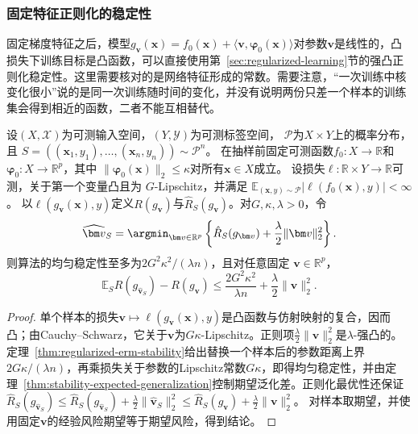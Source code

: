 \subsubsection{固定特征正则化的稳定性}

固定梯度特征之后，模型$g_{\bm v}(\bm x)=f_0(\bm x)+\langle\bm v,\bm\varphi_0(\bm x)\rangle$对参数$\bm v$是线性的，凸损失下训练目标是凸函数，可以直接使用第~\ref{sec:regularized-learning}节的强凸正则化稳定性。这里需要核对的是网络特征形成的常数。需要注意，“一次训练中核变化很小”说的是同一次训练随时间的变化，并没有说明两份只差一个样本的训练集会得到相近的函数，二者不能互相替代。

\begin{theorem}[正则化固定特征模型的稳定性]
\label{thm:ntk-stability-risk}
设$(X,\mathcal X)$为可测输入空间，$(Y,\mathcal Y)$为可测标签空间，
$\mathcal P$为$X\times Y$上的概率分布，且
$S=((\bm x_1,y_1),\ldots,(\bm x_n,y_n))\sim\mathcal P^n$。
在抽样前固定可测函数$f_0:X\to\mathbb R$和
$\bm\varphi_0:X\to\mathbb R^p$，其中
$\|\bm\varphi_0(\bm x)\|_2\leq\kappa$对所有$\bm x\in X$成立。
设损失$\ell:\mathbb R\times Y\to\mathbb R$可测，关于第一个变量凸且为
$G$-Lipschitz，并满足
$\mathbb E_{(\bm x,y)\sim\mathcal P}|\ell(f_0(\bm x),y)|<\infty$。
以$\ell(g_{\bm v}(\bm x),y)$定义$R(g_{\bm v})$与$\hat R_S(g_{\bm v})$。对$G,\kappa,\lambda>0$，令
\[
 \widehat{\bm v}_S=\argmin_{\bm v\in\mathbb R^p}
 \left\{\hat R_S(g_{\bm v})+\frac\lambda2\|\bm v\|_2^2\right\}.
\]
则算法的均匀稳定性至多为$2G^2\kappa^2/(\lambda n)$，且对任意固定
$\bm v\in\mathbb R^p$，
\[
 \mathbb E_S R(g_{\widehat{\bm v}_S})-R(g_{\bm v})
 \leq\frac{2G^2\kappa^2}{\lambda n}+\frac\lambda2\|\bm v\|_2^2.
\]
\end{theorem}
\begin{proof}
单个样本的损失$\bm v\mapsto\ell(g_{\bm v}(\bm x),y)$是凸函数与仿射映射的复合，因而凸；由Cauchy--Schwarz，它关于$\bm v$为$G\kappa$-Lipschitz。正则项$\frac\lambda2\|\bm v\|_2^2$是$\lambda$-强凸的。定理~\ref{thm:regularized-erm-stability}给出替换一个样本后的参数距离上界$2G\kappa/(\lambda n)$，再乘损失关于参数的Lipschitz常数$G\kappa$，即得均匀稳定性，并由定理~\ref{thm:stability-expected-generalization}控制期望泛化差。正则化最优性还保证
$\hat R_S(g_{\widehat{\bm v}_S})\leq\hat R_S(g_{\widehat{\bm v}_S})+\frac\lambda2\|\widehat{\bm v}_S\|_2^2\leq\hat R_S(g_{\bm v})+\frac\lambda2\|\bm v\|_2^2$。
对样本取期望，并使用固定$\bm v$的经验风险期望等于期望风险，得到结论。
\end{proof}

